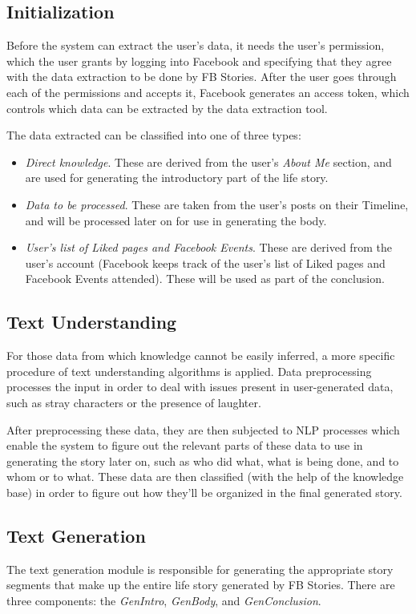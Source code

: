 \subsection{Initialization}
Before the system can extract the user's data, it needs the user's permission, which the user grants by logging into Facebook and specifying that they agree with the data extraction to be done by FB Stories. After the user goes through each of the permissions and accepts it, Facebook generates an access token, which controls which data can be extracted by the data extraction tool.

The data extracted can be classified into one of three types:
\begin{itemize}
	\item \textit{Direct knowledge}. These are derived from the user's \textit{About Me} section, and are used for generating the introductory part of the life story.
	\item \textit{Data to be processed}. These are taken from the user's posts on their Timeline, and will be processed later on for use in generating the body.
	\item  \textit{User's list of Liked pages and Facebook Events}. These are derived from the user's account (Facebook keeps track of the user's list of Liked pages and Facebook Events attended). These will be used as part of the conclusion.
\end{itemize}

\subsection{Text Understanding}
For those data from which knowledge cannot be easily inferred, a more specific procedure of text understanding algorithms is applied. Data preprocessing processes the input in order to deal with issues present in user-generated data, such as stray characters or the presence of laughter. 

After preprocessing these data, they are then subjected to NLP processes which enable the system to figure out the relevant parts of these data to use in generating the story later on, such as who did what, what is being done, and to whom or to what. These data are then classified (with the help of the knowledge base) in order to figure out how they'll be organized in the final generated story. 

\subsection{Text Generation}
The text generation module is responsible for generating the appropriate story segments that make up the entire life story generated by FB Stories. There are three components: the \textit{GenIntro}, \textit{GenBody}, and \textit{GenConclusion}.

